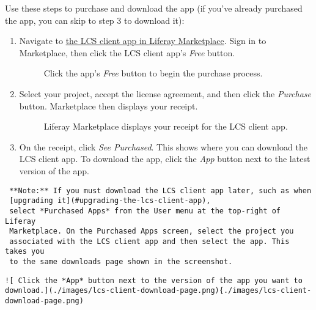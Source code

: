 \noindent\hrulefill

Use these steps to purchase and download the app (if you've already
purchased the app, you can skip to step 3 to download it):

\begin{enumerate}
\def\labelenumi{\arabic{enumi}.}
\item
  Navigate to
  \href{https://web.liferay.com/marketplace/-/mp/application/71774947}{the
  LCS client app in Liferay Marketplace}. Sign in to Marketplace, then
  click the LCS client app's \emph{Free} button.

  \begin{figure}
  \centering
  \caption{Click the app's \emph{Free} button to begin the purchase
  process.}
  \end{figure}
\item
  Select your project, accept the license agreement, and then click the
  \emph{Purchase} button. Marketplace then displays your receipt.

  \begin{figure}
  \centering
  \caption{Liferay Marketplace displays your receipt for the LCS client
  app.}
  \end{figure}
\item
  On the receipt, click \emph{See Purchased}. This shows where you can
  download the LCS client app. To download the app, click the \emph{App}
  button next to the latest version of the app.
\end{enumerate}

\noindent\hrulefill

\begin{verbatim}
 **Note:** If you must download the LCS client app later, such as when
 [upgrading it](#upgrading-the-lcs-client-app), 
 select *Purchased Apps* from the User menu at the top-right of Liferay 
 Marketplace. On the Purchased Apps screen, select the project you 
 associated with the LCS client app and then select the app. This takes you 
 to the same downloads page shown in the screenshot. 
\end{verbatim}

\noindent\hrulefill

\begin{verbatim}
![ Click the *App* button next to the version of the app you want to download.](./images/lcs-client-download-page.png){./images/lcs-client-download-page.png)
\end{verbatim}

